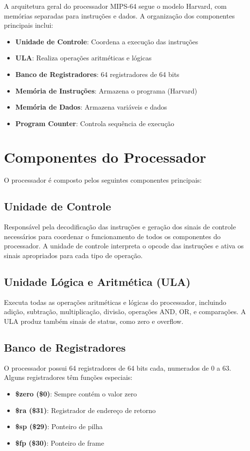 \documentclass[
	12pt,				%
	oneside,
	a4paper,			%
	english,			%
	french,				%
	spanish,			%
	brazil,				%
	]{abntex2}
\begin{document}
A arquitetura geral do processador MIPS-64 segue o modelo Harvard, com memórias separadas para instruções e dados. A organização dos componentes principais inclui:

\begin{itemize}
    \item \textbf{Unidade de Controle}: Coordena a execução das instruções
    \item \textbf{ULA}: Realiza operações aritméticas e lógicas
    \item \textbf{Banco de Registradores}: 64 registradores de 64 bits
    \item \textbf{Memória de Instruções}: Armazena o programa (Harvard)
    \item \textbf{Memória de Dados}: Armazena variáveis e dados
    \item \textbf{Program Counter}: Controla sequência de execução
\end{itemize}

\section{Componentes do Processador}

O processador é composto pelos seguintes componentes principais:

\subsection{Unidade de Controle}
Responsável pela decodificação das instruções e geração dos sinais de controle necessários para coordenar o funcionamento de todos os componentes do processador. A unidade de controle interpreta o opcode das instruções e ativa os sinais apropriados para cada tipo de operação.

\subsection{Unidade Lógica e Aritmética (ULA)}
Executa todas as operações aritméticas e lógicas do processador, incluindo adição, subtração, multiplicação, divisão, operações AND, OR, e comparações. A ULA produz também sinais de status, como zero e overflow.

\subsection{Banco de Registradores}
O processador possui 64 registradores de 64 bits cada, numerados de 0 a 63. Alguns registradores têm funções especiais:
\begin{itemize}
    \item \textbf{\$zero (\$0)}: Sempre contém o valor zero
    \item \textbf{\$ra (\$31)}: Registrador de endereço de retorno
    \item \textbf{\$sp (\$29)}: Ponteiro de pilha
    \item \textbf{\$fp (\$30)}: Ponteiro de frame
\end{itemize}
\end{document}
